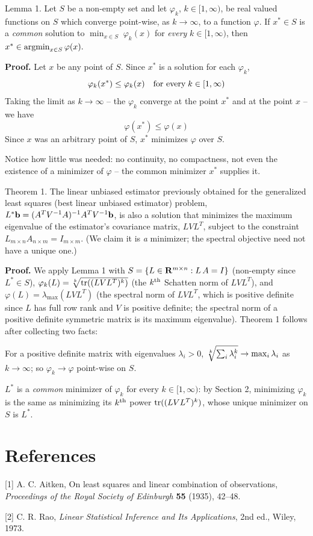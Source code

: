 \proclaim Lemma 1. Let $S$ be a non-empty set and let $\varphi_k$,
$k \in [1,\infty)$, be real valued functions on $S$ which converge
point-wise, as $k \rightarrow \infty$, to a function $\varphi$. If
$x^* \in S$ is a {\it common\/} solution to
$\min_{x \in S}\;\varphi_k(x)$
for {\it every\/} $k \in [1,\infty)$, then
$x^* \in \mathop{\rm argmin}_{x \in S} \varphi(x).$

{\bf Proof.}
Let $x$ be any point of $S$. Since $x^*$ is a solution for each $\varphi_k$,
$$
\varphi_k(x^*) \le \varphi_k(x) \quad \hbox{for every} \; k \in [1,\infty)
$$
Taking the limit as $k \rightarrow \infty$ -- the $\varphi_k$ converge at
the point $x^*$ and at the point $x$ -- we have
$$
\varphi(x^*) \le \varphi(x)
$$
Since $x$ was an arbitrary point of $S$, $x^*$ minimizes $\varphi$ over $S$.

Notice how little was needed: no continuity, no compactness, not even the
existence of a minimizer of $\varphi$ -- the common minimizer $x^*$ supplies
it.


\proclaim Theorem 1. The linear unbiased estimator previously obtained for the
generalized least squares (best linear unbiased estimator) problem,
$L^*{\bf b} =
(A^TV^{-1}A)^{-1}A^TV^{-1}{\bf b}$, is also a solution that
minimizes the maximum eigenvalue of the estimator's covariance matrix,
$LVL^T$, subject to the constraint $L_{m \times n}A_{n \times m} = I_{m \times m}$.
(We claim it is {\it a\/} minimizer; the spectral objective need not have a
unique one.)

{\bf Proof.} We apply Lemma 1 with
$S = \{L \in {\bf R}^{m \times n} : L\, A = I\}$ (non-empty
since $L^* \in S$),
$\varphi_k(L) = \root k \of {{\rm tr}((LVL^T)^k)}$ (the $k^{\rm th}$ Schatten norm of $LVL^T$),
and $\varphi(L) = \lambda_{\max}(LVL^T)$ (the spectral norm of $LVL^T$, which is
positive definite since $L$ has full row rank and $V$ is positive definite;
the spectral norm of a positive definite symmetric matrix is its maximum
eigenvalue).
Theorem 1 follows after collecting two facts:

\item{For a positive definite matrix with eigenvalues $\lambda_i > 0$,
$\root k \of {\sum_i \lambda_i^k} \to \max_i \lambda_i$ as $k \to \infty$;
so $\varphi_k \to \varphi$ point-wise on $S$.}
\item{$L^*$ is a {\it common\/} minimizer of $\varphi_k$ for every
$k \in [1, \infty)$: by Section 2, minimizing $\varphi_k$ is the same as
minimizing its $k^{\rm th}$ power ${\rm tr}((LVL^T)^k)$, whose unique
minimizer on $S$ is $L^*$.}

\section{References}
{\parskip=4pt
[1] A. C. Aitken, On least squares and linear combination of observations,
{\it Proceedings of the Royal Society of Edinburgh\/} {\bf 55} (1935),
42--48.

[2] C. R. Rao, {\it Linear Statistical Inference and Its Applications\/},
2nd ed., Wiley, 1973.
}

\bye
